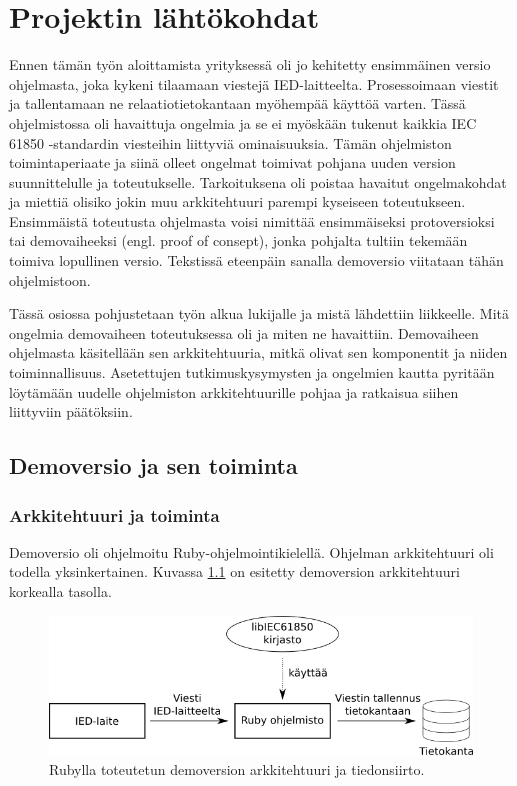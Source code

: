 \chapter{Projektin lähtökohdat}
\label{ch:projektin-lähtökohdat}
Ennen tämän työn aloittamista yrityksessä oli jo kehitetty ensimmäinen versio ohjelmasta, joka kykeni tilaamaan viestejä IED-laitteelta. Prosessoimaan viestit ja tallentamaan ne relaatiotietokantaan myöhempää käyttöä varten. Tässä ohjelmistossa oli havaittuja ongelmia ja se ei myöskään tukenut kaikkia IEC 61850 -standardin viesteihin liittyviä ominaisuuksia. Tämän ohjelmiston toimintaperiaate ja siinä olleet ongelmat toimivat pohjana uuden version suunnittelulle ja toteutukselle. Tarkoituksena oli poistaa havaitut ongelmakohdat ja miettiä olisiko jokin muu arkkitehtuuri parempi kyseiseen toteutukseen. Ensimmäistä toteutusta ohjelmasta voisi nimittää ensimmäiseksi protoversioksi tai demovaiheeksi (engl. proof of consept), jonka pohjalta tultiin tekemään toimiva lopullinen versio. Tekstissä eteenpäin sanalla demoversio viitataan tähän ohjelmistoon.

Tässä osiossa pohjustetaan työn alkua lukijalle ja mistä lähdettiin liikkeelle. Mitä ongelmia demovaiheen toteutuksessa oli ja miten ne havaittiin. Demovaiheen ohjelmasta käsitellään sen arkkitehtuuria, mitkä olivat sen komponentit ja niiden toiminnallisuus. Asetettujen tutkimuskysymysten ja ongelmien kautta pyritään löytämään uudelle ohjelmiston arkkitehtuurille pohjaa ja ratkaisua siihen liittyviin päätöksiin.


\section{Demoversio ja sen toiminta}


\subsection{Arkkitehtuuri ja toiminta}
Demoversio oli ohjelmoitu Ruby-ohjelmointikielellä. Ohjelman arkkitehtuuri oli todella yksinkertainen. Kuvassa \ref{fig:demo-architecture} on esitetty demoversion arkkitehtuuri korkealla tasolla.

\begin{figure}
	\includegraphics[width=1\textwidth]{pictures/demo-architecture.png}
	\caption{Rubylla toteutetun demoversion arkkitehtuuri ja tiedonsiirto.}
	\label{fig:demo-architecture}
\end{figure}


